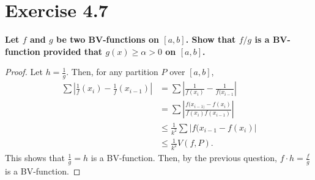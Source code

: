 \documentclass[paper=a4, fontsize=11pt]{scrartcl} %
\begin{document}
\section*{Exercise 4.7}
\boldmath
\textbf{Let $f$ and $g$ be two BV-functions on $[a, b]$.  Show that $f/g$ is a BV-function provided that $g(x) \geq \alpha > 0$ on $[a, b]$.}
\unboldmath
\begin{proof}
Let $h = \frac{1}{g}$.  Then, for any partition $P$ over $[a, b]$, 
\begin{align*}
\sum \left| \frac{1}{f}(x_i) - \frac{1}{f}(x_{i - 1}) \right| &= \sum \left| \frac{1}{f(x_i)} - \frac{1}{f(x_{i-1}} \right|
\\   &= \sum \left | \frac{f(x_{i -1)} - f(x_i)}{f(x_i)f(x_{i -1})} \right |
\\	&\leq \frac{1}{k^2} \sum \left | f(x_{i-1} - f(x_i) \right |
\\	&\leq \frac{1}{k^2} V (f,P).
\end{align*}
This shows that $\frac{1}{g} = h$ is a BV-function.  Then, by the previous question, $f \cdot h = \frac{f}{g}$ is a BV-function.
\end{proof}



\end{document}

